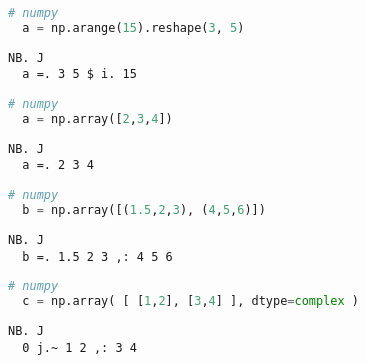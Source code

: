 \begin{tcolorbox}[breakable, size=fbox, boxrule=1pt, pad at break*=1mm,colback=cellbackground, colframe=cellborder]
\begin{lstlisting}[language=python, frame=single, framerule=0pt, basicstyle=\ttfamily\normalsize, keywordstyle=\bfseries\color{keywcolor}\normalsize]
  # numpy
  a = np.arange(15).reshape(3, 5)
\end{lstlisting}

\begin{lstlisting}[language=jdoc, frame=single, framerule=0pt, basicstyle=\ttfamily\normalsize, keywordstyle=\bfseries\color{keywcolor}\normalsize] 
  NB. J 
  a =. 3 5 $ i. 15
\end{lstlisting}

\begin{lstlisting}[language=python, frame=single, framerule=0pt, basicstyle=\ttfamily\normalsize, keywordstyle=\bfseries\color{keywcolor}\normalsize]
  # numpy 
  a = np.array([2,3,4])
\end{lstlisting} 

\begin{lstlisting}[language=jdoc, frame=single, framerule=0pt, basicstyle=\ttfamily\normalsize, keywordstyle=\bfseries\color{keywcolor}\normalsize]    
  NB. J 
  a =. 2 3 4 
\end{lstlisting} 

\begin{lstlisting}[language=python, frame=single, framerule=0pt, basicstyle=\ttfamily\normalsize, keywordstyle=\bfseries\color{keywcolor}\normalsize]
  # numpy 
  b = np.array([(1.5,2,3), (4,5,6)])
\end{lstlisting}

\begin{lstlisting}[language=jdoc, frame=single, framerule=0pt, basicstyle=\ttfamily\normalsize, keywordstyle=\bfseries\color{keywcolor}\normalsize]    
  NB. J 
  b =. 1.5 2 3 ,: 4 5 6
\end{lstlisting}

\begin{lstlisting}[language=python, frame=single, framerule=0pt, basicstyle=\ttfamily\normalsize, keywordstyle=\bfseries\color{keywcolor}\normalsize]
  # numpy 
  c = np.array( [ [1,2], [3,4] ], dtype=complex ) 
\end{lstlisting}

\begin{lstlisting}[language=jdoc, frame=single, framerule=0pt, basicstyle=\ttfamily\normalsize, keywordstyle=\bfseries\color{keywcolor}\normalsize]   
  NB. J 
  0 j.~ 1 2 ,: 3 4  
\end{lstlisting}


\end{tcolorbox}
